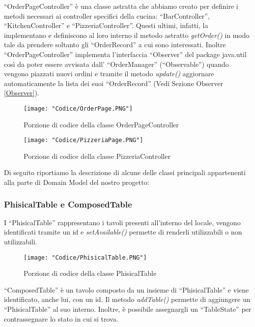 \documentclass{article}
\begin{document}
``OrderPageController'' \`e una classe astratta che abbiamo creato per definire i metodi necessari ai controller specifici della cucina: ``BarController'', ``KitchenController'' e ``PizzeriaController''. Questi ultimi, infatti, la implementano e definiscono al loro interno il metodo astratto \textit{getOrder()} in modo tale da prendere soltanto gli ``OrderRecord'' a cui sono interessati. Inoltre ``OrderPageController'' implementa l'interfaccia ``Observer'' del package java.util cos\`i da poter essere avvisata dall' ``OrderManager'' (``Observable'') quando vengono piazzati nuovi ordini e tramite il metodo \textit{update()} aggiornare automaticamente la lista dei suoi ``OrderRecord'' (Vedi Sezione Observer \ref{Observer}).

\begin{figure}[!h]
\centering
\texttt{[image: "Codice/OrderPage.PNG"]}
\caption{Porzione di codice della classe OrderPageController}
\end{figure}

\begin{figure}[!h]
\centering
\texttt{[image: "Codice/PizzeriaPage.PNG"]}
\caption{Porzione di codice della classe PizzeriaController}
\end{figure}

\newpage

\noindent Di seguito riportiamo la descrizione di alcune delle classi principali appartenenti alla parte di Domain Model del nostro progetto: 

\subsubsection{PhisicalTable e ComposedTable}

I ``PhisicalTable'' rappresentano i tavoli presenti all'interno del locale, vengono identificati tramite un id e \textit{setAvailable()} permette di renderli utilizzabili o non utilizzabili.

\begin{figure}[!h]
\centering
\texttt{[image: "Codice/PhisicalTable.PNG"]}
\caption{Porzione di codice della classe PhisicalTable}
\end{figure}


\noindent ``ComposedTable'' \`e un tavolo composto da un insieme di ``PhisicalTable'' e viene identificato, anche lui, con un id. Il metodo \textit{addTable()} permette di aggiungere un ``PhisicalTable'' al suo interno. Inoltre, \`e possibile assegnargli un ``TableState'' per contrassegnare lo stato in cui si trova.
\end{document}
